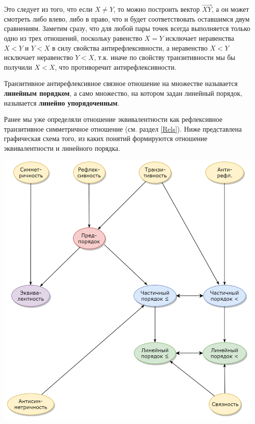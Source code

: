 \begin{enumerate}
{\begin{enumerate}[{\bf Rel1}]
Это следует из того, что если $X\ne Y$, то можно построить вектор $\vec{XY}$, а он может смотреть либо влево, либо в право, что и будет соответствовать оставшимся двум сравнениям. Заметим сразу, что для любой пары точек всегда выполняется только одно из трех отношений, поскольку равенство $X=Y$ исключает неравенства $X<Y$ и $Y<X$ в силу свойства антирефлексивности, а неравенство $X<Y$ исключает неравенство $Y<X$, т.к. иначе по свойству транзитивности мы бы получили $X<X$, что противоречит антирефлексивности.
\end{enumerate}
\item Транзитивное антирефлексивное связное отношение на множестве называется \textbf{линейным порядком}, а само множество, на котором задан линейный порядок, называется \textbf{линейно упорядоченным}.

\item Ранее мы уже определяли отношение эквивалентности как рефлексивное транзитивное симметричное отношение (см. раздел \ref{Rels}). Ниже представлена графическая схема того, из каких понятий формируются отношение эквивалентности и линейного порядка.
\begin{center}
\includegraphics[scale=0.4]{RelOrder.png}
\end{center}

}
\end{enumerate}
